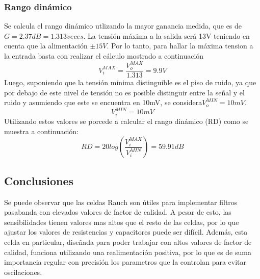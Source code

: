 \subsubsection{Rango din\'amico}
Se calcula el rango din\'amico utlizando la mayor ganancia medida, que es de $G=2.37dB = 1.313 veces$. La tensi\'on m\'axima a la salida ser\'a 13V teniendo en cuenta que la alimentaci\'on $\pm 15V$. Por lo tanto, para hallar la m\'axima tension a la entrada basta con realizar el c\'alculo mostrado a continuaci\'on
\begin{equation}
    V_i^{MAX} = \frac{V_o^{MAX}}{1.313} = 9.9V
\end{equation}
\newline\noindent
Luego, suponiendo que la  tensi\'on m\'inima distinguible es el piso de ruido, ya que por debajo de este nivel de tensi\'on no es posible distinguir entre la se\~nal y el ruido y asumiendo que este se encuentra en 10mV, se considera$V_o^{MIN}=10mV$.
\begin{equation}
    V_i^{MIN} = 10mV
\end{equation}
\newline\noindent
Utilizando estos valores se porcede a calcular el rango din\'amico (RD) como se muestra a continuaci\'on:
\begin{equation}
    RD = 20log(\frac{V_i^{MAX}}{V_i^{MIN}})= 59.91dB
\end{equation}

\subsection{Conclusiones}
Se puede observar que las celdas Rauch son \'utiles para implementar filtros pasabanda con elevados valores de factor de calidad. A pesar de esto, las sensibilidades tienen valores mas altos que el resto de las celdas, por lo que ajustar los valores de resistencias y capacitores puede ser dif\'icil. Adem\'as, esta celda en particular, dise\~nada para poder trabajar con altos valores de factor de calidad, funciona utilizando una realimentaci\'on positiva, por lo que es de suma importancia regular con precisi\'on los parametros que la controlan para evitar oscilaciones.